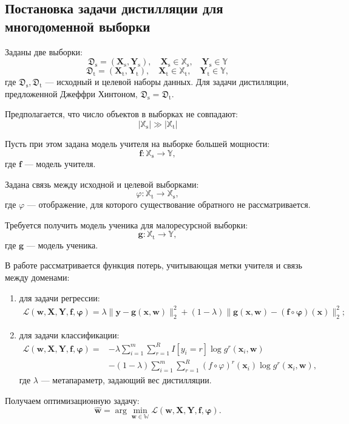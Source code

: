 \subsection{Постановка задачи дистилляции для многодоменной выборки}

Заданы две выборки:
$$\mathfrak{D}_{\text{s}}=(\mathbf{X}_{\text{s}},\mathbf{Y}_{\text{s}}),
\quad \mathbf{X}_{\text{s}} \in \mathbb{X}_{\text{s}},
\quad \mathbf{Y}_{\text{s}} \in \mathbb{Y}$$
$$\mathfrak{D}_{\text{t}}=(\mathbf{X}_{\text{t}},\mathbf{Y}_{\text{t}}), \quad \mathbf{X}_{\text{t}} \in \mathbb{X}_{\text{t}},
\quad \mathbf{Y}_{\text{t}} \in \mathbb{Y},$$
где $\mathfrak{D}_{\text{s}}, \mathfrak{D}_{\text{t}}$ --- исходный и целевой наборы данных. Для задачи дистилляции, предложенной Джеффри Хинтоном, $\mathfrak{D}_{\text{s}}=\mathfrak{D}_{\text{t}}$.

Предполагается, что число объектов в выборках не совпадают:
$$|\mathbb{X}_{\text{s}}| \gg |\mathbb{X}_{\text{t}}|$$

Пусть при этом задана модель учителя на выборке большей мощности:
$$\mathbf{f}: \mathbb{X}_{\text{s}} \rightarrow \mathbb{Y},$$
где $\mathbf{f}$ --- модель учителя.

Задана связь между исходной и целевой выборками:
$$\varphi: \mathbb{X}_{\text{t}} \rightarrow \mathbb{X}_{\text{s}},$$
где $\varphi$ --- отображение, для которого существование обратного не рассматривается.

Требуется получить модель ученика для малоресурсной выборки:
$$\mathbf{g}: \mathbb{X}_{\text{t}} \rightarrow \mathbb{Y},$$
где $\mathbf{g}$ --- модель ученика.

В работе рассматривается функция потерь, учитывающая метки учителя и связь между доменами:
\begin{enumerate}
    \item для задачи регрессии:
    \[
    \begin{aligned}
    \mathcal{L}(\mathbf{w,X,Y,f,\varphi})=\lambda\|\mathbf{y}-\mathbf{g}(\mathbf{x},\mathbf{w})\|_{2}^{2}+(1-\lambda)\|\mathbf{g}(\mathbf{x},\mathbf{w})-(\mathbf{f}\circ \mathbf{\varphi})(\mathbf{x})\|_{2}^{2};
    \end{aligned}
    \]
    \item для задачи классификации:
    \[
    \begin{aligned}
    \mathcal{L}(\mathbf{w,X,Y,f,\varphi})=&-\lambda\sum\limits_{i=1}^{m}\sum\limits_{r=1}^{R}I[y_{i}=r]\log{g^{r}(\mathbf{x}_{i},\mathbf{w})}\\
    &-(1-\lambda)\sum\limits_{i=1}^{m}\sum\limits_{r=1}^{R}(f\circ \varphi)^{r}(\mathbf{x}_{i})\log{g^{r}(\mathbf{x}_{i},\mathbf{w})},
    \end{aligned}
    \]
    где $\lambda$ --- метапараметр, задающий вес дистилляции.
\end{enumerate}

Получаем оптимизационную задачу:
$$\hat{\mathbf{w}} = \arg\min_{\mathbf{w} \in \mathbb{W}} \mathcal{L}(\mathbf{w,X,Y,f,\varphi}).$$
